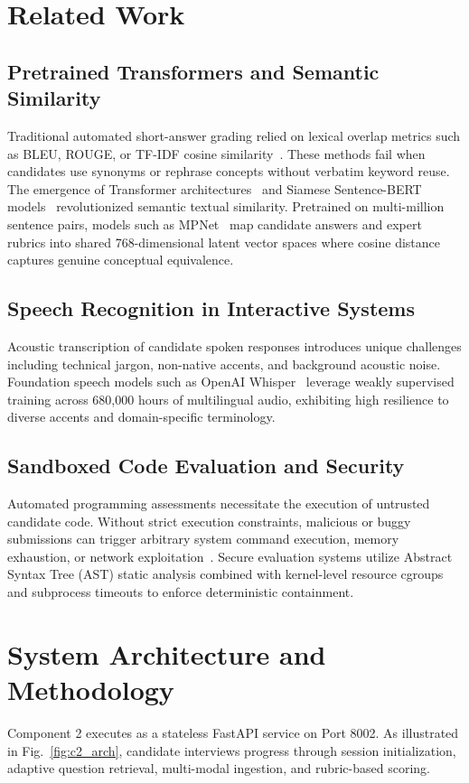 \documentclass[conference]{IEEEtran}
\begin{document}
\section{Related Work}
\subsection{Pretrained Transformers and Semantic Similarity}
Traditional automated short-answer grading relied on lexical overlap metrics such as BLEU, ROUGE, or TF-IDF cosine similarity~\cite{robertson2009probabilistic}. These methods fail when candidates use synonyms or rephrase concepts without verbatim keyword reuse. The emergence of Transformer architectures~\cite{vaswani2017attention} and Siamese Sentence-BERT models~\cite{reimers2019sentence} revolutionized semantic textual similarity. Pretrained on multi-million sentence pairs, models such as MPNet~\cite{song2020mpnet} map candidate answers and expert rubrics into shared 768-dimensional latent vector spaces where cosine distance captures genuine conceptual equivalence.

\subsection{Speech Recognition in Interactive Systems}
Acoustic transcription of candidate spoken responses introduces unique challenges including technical jargon, non-native accents, and background acoustic noise. Foundation speech models such as OpenAI Whisper~\cite{radford2023robust} leverage weakly supervised training across 680,000 hours of multilingual audio, exhibiting high resilience to diverse accents and domain-specific terminology.

\subsection{Sandboxed Code Evaluation and Security}
Automated programming assessments necessitate the execution of untrusted candidate code. Without strict execution constraints, malicious or buggy submissions can trigger arbitrary system command execution, memory exhaustion, or network exploitation~\cite{cully2018sandbox}. Secure evaluation systems utilize Abstract Syntax Tree (AST) static analysis combined with kernel-level resource cgroups and subprocess timeouts to enforce deterministic containment.

\section{System Architecture and Methodology}
Component 2 executes as a stateless FastAPI service on Port 8002. As illustrated in Fig.~\ref{fig:c2_arch}, candidate interviews progress through session initialization, adaptive question retrieval, multi-modal ingestion, and rubric-based scoring.
\end{document}
